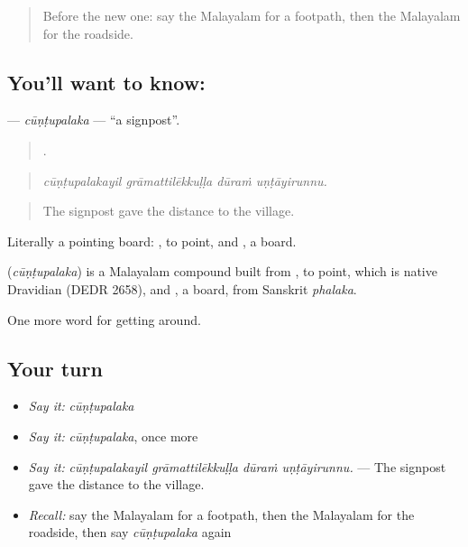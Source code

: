 \label{lesson:ML-C469-cuntupalaka}



\begin{quote}
Before the new one: say the Malayalam for a footpath, then the Malayalam for the roadside.
\end{quote}

\subsection*{You'll want to know: }
\textbf{} — \emph{cūṇṭupalaka} — \textquotedblleft{}a signpost\textquotedblright{}.

\begin{quote}
   .
\end{quote}

\begin{quote}
\emph{cūṇṭupalakayil grāmattilēkkuḷḷa dūraṁ uṇṭāyirunnu.}
\end{quote}

\begin{quote}
The signpost gave the distance to the village.
\end{quote}

Literally a pointing board: , to point, and , a board.

\begin{cousinweb}
\textbf{} (\emph{cūṇṭupalaka}) is a Malayalam compound built from , to point, which is native Dravidian (DEDR 2658), and , a board, from Sanskrit \emph{phalaka}.
\end{cousinweb}

\begin{grammarlens}[title={What you've built}]
One more word for getting around.
\end{grammarlens}

\subsection*{Your turn}
\begin{itemize}
\raggedright
  \item \emph{Say it:} \emph{cūṇṭupalaka}
  \item \emph{Say it:} \emph{cūṇṭupalaka}, once more
  \item \emph{Say it:} \emph{cūṇṭupalakayil grāmattilēkkuḷḷa dūraṁ uṇṭāyirunnu.} — The signpost gave the distance to the village.
  \item \emph{Recall:} say the Malayalam for a footpath, then the Malayalam for the roadside, then say \emph{cūṇṭupalaka} again
\end{itemize}

